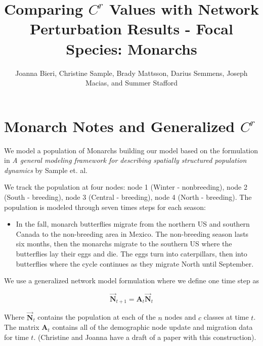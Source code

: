 \documentclass[10pt]{article}
\title{Comparing $C^r$ Values with Network Perturbation Results - Focal Species: Monarchs}
\date{}
\author{Joanna Bieri, Christine Sample, Brady Mattsson, Darius Semmens, Joseph Macias, and Summer Stafford}
\begin{document}


\newcommand{\multilineR}[1]{\begin{tabular}[b]{@{}r@{}}#1\end{tabular}}
\newcommand{\multilineL}[1]{\begin{tabular}[b]{@{}l@{}}#1\end{tabular}}
\newcommand{\multilineC}[1]{\begin{tabular}[b]{@{}c@{}}#1\end{tabular}}

\thispagestyle{empty}

\maketitle

\tableofcontents


\section{Monarch Notes and Generalized \texorpdfstring{$C^r$}{CR} }
We model a population of Monarchs building our model based on the formulation in  {\it{A general modeling framework for describing spatially structured population dynamics}} by Sample et. al.

We track the population at four nodes: node 1 (Winter - nonbreeding), node 2 (South - breeding), node 3 (Central - breeding), node 4 (North - breeding). The population is modeled through seven times steps for each season:
\begin{itemize}
\item In the fall, monarch butterflies migrate from the northern US and southern Canada to the non-breeding area in Mexico. The non-breeding season lasts six months, then the monarchs migrate to the southern US where the butterflies lay their eggs and die. The eggs turn into caterpillars, then into butterflies where the cycle continues as they migrate North until September.
\end{itemize}

We use a generalized network model formulation where we define one time step as

\begin{equation}
\vec{\mathbf{N}}_{t+1}={\mathbf{A}_t}\vec{\mathbf{N}}_t
\end{equation}

Where $\vec{\mathbf{N}}_{t}$ contains the population at each of the $n$ nodes and $c$ classes at time $t$. The matrix $\mathbf{A}_t$ contains all of the demographic node update and migration data for time $t$. (Christine and Joanna have a draft of a paper with this construction).\\
\end{document}
